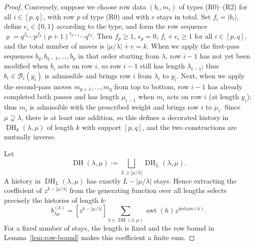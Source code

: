 \documentclass[11pt]{amsart}
\numberwithin{equation}{section}
\theoremstyle{definition}
\theoremstyle{remark}
\newcommand{\swt}{\operatorname{swt}}
\newcommand{\cB}{\mathcal B}
\newcommand{\DHist}{\operatorname{DH}}
\begin{document}
\begin{proof}
Conversely, suppose we choose row data $(b_i,m_i)$ of types
\textup{(R0)}--\textup{(R2)} for all $i\in[p,q]$, with row $p$ of type
\textup{(R0)} and with $e$ stays in total. Set $f_i=|b_i|$, define
$\epsilon_i\in\{0,1\}$ according to the type, and form the row sequence $\varrho=q^{f_q}\cdots p^{f_p}(p+1)^{\epsilon_{p+1}}\cdots q^{\epsilon_q}$.
Then $f_p\geq1$, $\epsilon_p=0$, $f_i+\epsilon_i\geq1$ for all $i\in[p,q]$,
and the total number of moves is $|\mu/\lambda|+e=k$. When we apply the
first-pass sequences $b_q,b_{q-1},\dots,b_p$ in that order starting from
$\lambda$, row $i-1$ has not yet been modified when $b_i$ acts on row $i$, so
row $i-1$ still has length $\lambda_{i-1}$; thus $b_i\in\cB_i(y_i)$ is
admissible and brings row $i$ from $\lambda_i$ to $y_i$. Next, when we apply
the second-pass moves $m_{p+1},\dots,m_q$ from top to bottom, row $i-1$ has
already completed both passes and has length $\mu_{i-1}$ when $m_i$ acts on
row $i$ (at length $y_i$); thus $m_i$ is admissible with the prescribed weight
and brings row $i$ to $\mu_i$. Since $\mu\supsetneq\lambda$, there is at least
one addition, so this defines a decorated history in $\DHist_k(\lambda,\mu)$ of length $k$
with support $[p,q]$, and the two constructions are mutually inverse.

Let
\[
 \DHist(\lambda,\mu)
 :=\bigsqcup_{L\geq|\mu/\lambda|}\DHist_L(\lambda,\mu).
\]
A history in $\DHist_L(\lambda,\mu)$ has exactly
$L-|\mu/\lambda|$ stays. Hence extracting the coefficient of
$z^{k-|\mu/\lambda|}$ from the generating function over all
lengths selects precisely the histories of length $k$:
\[
 b^{(k)}_{\lambda\mu}
 =[z^{k-|\mu/\lambda|}]
 \sum_{h\in\DHist(\lambda,\mu)}
       \swt(h)z^{\#\mathrm{stays}(h)}.
\]
For a fixed number of stays, the length is fixed and the row
bound in Lemma~\ref{lem:row-bound} makes this coefficient a
finite sum.


\end{proof}
\end{document}
